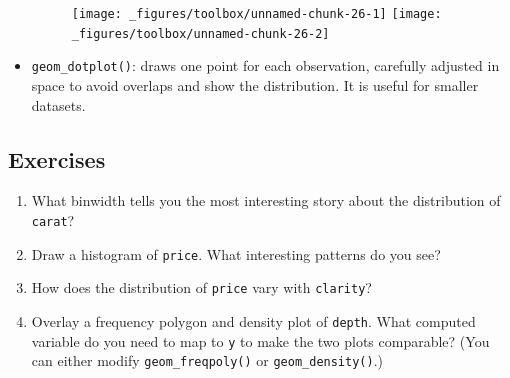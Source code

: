 \begin{itemize}
\begin{Shaded}
\begin{Highlighting}[]
\StringTok{ }
\StringTok{  }\NormalTok{()}
\StringTok{ }
\StringTok{  }\NormalTok{(}\NormalTok{(} \NormalTok{))) +}\StringTok{ }
\StringTok{  }\NormalTok{(}\NormalTok{, }\NormalTok{)}
\end{Highlighting}
\end{Shaded}

  \begin{figure}[H]
    \texttt{[image: \_figures/toolbox/unnamed-chunk-26-1]}%
    \texttt{[image: \_figures/toolbox/unnamed-chunk-26-2]}
  \end{figure}
\item
  \texttt{geom\_dotplot()}: draws one point for each observation,
  carefully adjusted in space to avoid overlaps and show the
  distribution. It is useful for smaller datasets.
   
\end{itemize}

\subsection{Exercises}\label{exercises-2}

\begin{enumerate}
\def\labelenumi{\arabic{enumi}.}
\item
  What binwidth tells you the most interesting story about the
  distribution of \texttt{carat}?
\item
  Draw a histogram of \texttt{price}. What interesting patterns do you
  see?
\item
  How does the distribution of \texttt{price} vary with
  \texttt{clarity}?
\item
  Overlay a frequency polygon and density plot of \texttt{depth}. What
  computed variable do you need to map to \texttt{y} to make the two
  plots comparable? (You can either modify \texttt{geom\_freqpoly()} or
  \texttt{geom\_density()}.)
\end{enumerate}

